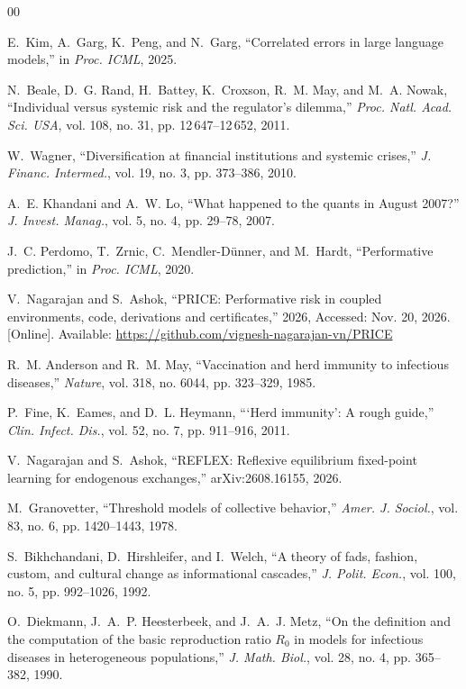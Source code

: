 \documentclass[conference]{IEEEtran}
\theoremstyle{definition}
\begin{document}
\begin{thebibliography}{00}

 E.~Kim, A.~Garg, K.~Peng, and N.~Garg, ``Correlated errors
in large language models,'' in \emph{Proc. ICML}, 2025.

 N.~Beale, D.~G. Rand, H.~Battey, K.~Croxson, R.~M. May,
and M.~A. Nowak, ``Individual versus systemic risk and the regulator's
dilemma,'' \emph{Proc. Natl. Acad. Sci. USA}, vol. 108, no. 31,
pp. 12\,647--12\,652, 2011.

 W.~Wagner, ``Diversification at financial institutions
and systemic crises,'' \emph{J. Financ. Intermed.}, vol. 19, no. 3,
pp. 373--386, 2010.

 A.~E. Khandani and A.~W. Lo, ``What happened to the
quants in August 2007?'' \emph{J. Invest. Manag.}, vol. 5, no. 4,
pp. 29--78, 2007.

 J.~C. Perdomo, T.~Zrnic, C.~Mendler-D\"unner, and
M.~Hardt, ``Performative prediction,'' in \emph{Proc. ICML}, 2020.

 V.~Nagarajan and S.~Ashok, ``PRICE: Performative risk in
coupled environments, code, derivations and certificates,'' 2026, Accessed:
Nov. 20, 2026. [Online]. Available:
\url{https://github.com/vignesh-nagarajan-vn/PRICE}

 R.~M. Anderson and R.~M. May, ``Vaccination and herd
immunity to infectious diseases,'' \emph{Nature}, vol. 318, no. 6044,
pp. 323--329, 1985.

 P.~Fine, K.~Eames, and D.~L. Heymann, ```Herd immunity': A
rough guide,'' \emph{Clin. Infect. Dis.}, vol. 52, no. 7, pp. 911--916, 2011.

 V.~Nagarajan and S.~Ashok, ``REFLEX: Reflexive
equilibrium fixed-point learning for endogenous exchanges,''
arXiv:2608.16155, 2026.

 M.~Granovetter, ``Threshold models of collective
behavior,'' \emph{Amer. J. Sociol.}, vol. 83, no. 6, pp. 1420--1443, 1978.

 S.~Bikhchandani, D.~Hirshleifer, and I.~Welch, ``A
theory of fads, fashion, custom, and cultural change as informational
cascades,'' \emph{J. Polit. Econ.}, vol. 100, no. 5, pp. 992--1026, 1992.

 O.~Diekmann, J.~A.~P. Heesterbeek, and J.~A.~J. Metz,
``On the definition and the computation of the basic reproduction ratio $R_0$
in models for infectious diseases in heterogeneous populations,''
\emph{J. Math. Biol.}, vol. 28, no. 4, pp. 365--382, 1990.


\end{thebibliography}
\end{document}
